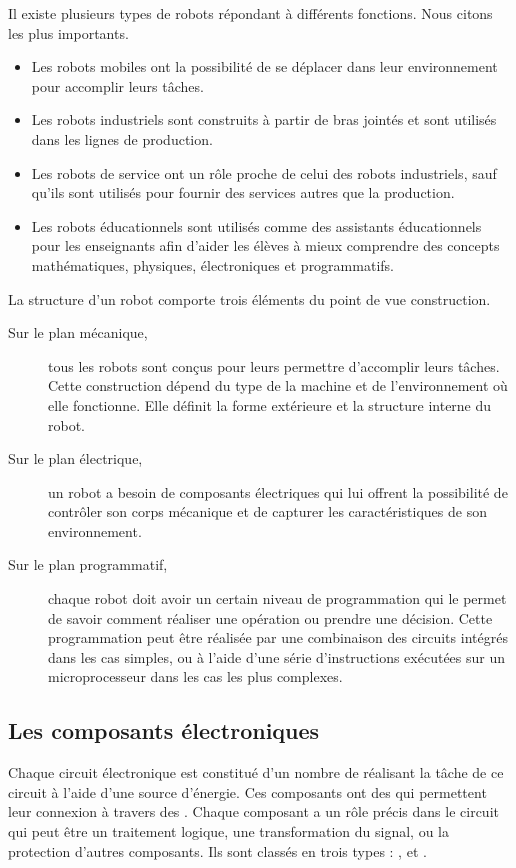 Il existe plusieurs types de robots répondant à différents fonctions. Nous
citons les plus importants.

\begin{itemize}
  \item Les robots mobiles ont la possibilité de se déplacer dans leur
  environnement pour accomplir leurs tâches.
  \item Les robots industriels sont construits à partir de bras jointés et
  sont utilisés dans les lignes de production.
  \item Les robots de service ont un rôle proche de celui des robots
  industriels, sauf qu'ils sont utilisés pour fournir des services autres que
  la production.
  \item Les robots éducationnels sont utilisés comme des assistants
  éducationnels pour les enseignants afin d'aider les élèves à mieux comprendre
  des concepts mathématiques, physiques, électroniques et programmatifs.
\end{itemize}

La structure d'un robot comporte trois éléments du point de vue construction.

\begin{description}
  \item[Sur le plan mécanique,] tous les robots sont conçus pour leurs
  permettre d'accomplir leurs tâches. Cette construction dépend du type de la
  machine et de l'environnement où elle fonctionne. Elle définit la forme
  extérieure et la structure interne du robot.
  \item[Sur le plan électrique,] un robot a besoin de composants
  électriques qui lui offrent la possibilité de
  contrôler son corps mécanique et de capturer les caractéristiques de son
  environnement.
  \item[Sur le plan programmatif,] chaque robot doit avoir un certain
  niveau de programmation qui le permet de
  savoir comment réaliser une opération ou prendre une décision. Cette
  programmation peut être réalisée par une combinaison des circuits intégrés dans
  les cas simples, ou à l'aide d'une série d'instructions exécutées sur un
  microprocesseur dans les cas les plus complexes.\cite{wikipediaRobotics}
\end{description}

\subsection{Les composants électroniques}
Chaque circuit électronique est constitué d'un nombre de 
réalisant la tâche de ce circuit à l'aide d'une source d'énergie. Ces composants
ont des  qui permettent leur connexion à travers des
. Chaque composant a un rôle précis dans le circuit qui peut être
un traitement logique, une transformation du signal, ou la protection d'autres
composants. Ils sont classés en trois types : ,
 et .\cite{wikipediaElectronicComponent}

